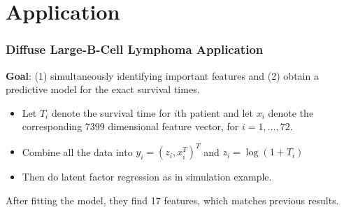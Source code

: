 \documentclass{beamer}
\begin{document}
	\section{Application}
	\begin{frame}
		\frametitle{Diffuse Large-B-Cell Lymphoma Application}
		\textbf{Goal}: (1) simultaneously identifying important features and (2) obtain a predictive model for the exact survival times.\\
		\begin{itemize}
			\item 
			Let $T_i$ denote the survival time for $i$th patient and let $x_i$ denote the corresponding 7399 dimensional feature vector, for $i=1,\ldots,72$.
			\item
			Combine all the data into $y_i = (z_i, x_i^T)^T$ and $z_i =\log(1+T_i)$
			\item
			Then do latent factor regression as in simulation example.
		\end{itemize}
		After fitting the model, they find 17 features, which matches previous results.
	\end{frame}
	
	
	
	
\end{document}
